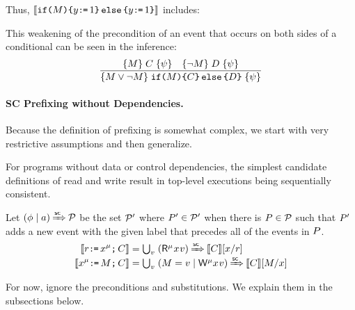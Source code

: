 Thus, $\llbracket\texttt{if}\allowbreak\texttt{(}M\texttt{)}\allowbreak\texttt{\{} y\texttt{:}\mkern-1mu\texttt{=}\,1 \texttt{\}}\,\allowbreak\texttt{else}\allowbreak\,\texttt{\{} y\texttt{:}\mkern-1mu\texttt{=}\,1\texttt{\}}\rrbracket$ includes:
\begin{tikzdisplay}[node distance=1em]
\end{tikzdisplay}
This weakening of the precondition of an event that occurs on both sides of a
conditional can be seen in the inference:
\begin{displaymath}
  \frac{
    \{M\}\allowbreak\;C\;\allowbreak\{\psi\}
    \quad
    \{\lnot M\}\allowbreak\;D\;\allowbreak\{\psi\}
  }{
    \{M\lor \lnot M\}\allowbreak\;\texttt{if}\allowbreak\texttt{(}M\texttt{)}\allowbreak\texttt{\{} C \texttt{\}}\,\allowbreak\texttt{else}\allowbreak\,\texttt{\{} D\texttt{\}}\;\allowbreak\{\psi\}
  }
\end{displaymath}


\paragraph{SC Prefixing without Dependencies.}
Because the definition of prefixing is somewhat complex, we start with very
restrictive assumptions and then generalize.

For programs without data or control dependencies, the
simplest candidate definitions of read and write
result in top-level executions being sequentially consistent.
\begin{candidate}
  \label{def:rw:sc1}
  Let $(\phi \mid a) \mathbin{\smash{\xRightarrow{\mathsf{sc}}}} \mathcal{P}$ be the set $\mathcal{P}'$ where
  $P'\in\mathcal{P}'$ when there is $P\in\mathcal{P}$ such that $P'$ adds a
  new event with the given label that precedes all of the events in $P$.
  \begin{align*}
    \sem{\aReg\GETS\aLoc^\amode\SEMI \aCmd} & =
    \textstyle\bigcup_\aVal\; (\DRmode\aLoc\aVal) \prefixsc \sem{\aCmd}[\aLoc/\aReg] 
    \\
    \sem{\aLoc^\amode\GETS\aExp\SEMI \aCmd} & =
    \textstyle\bigcup_\aVal\; (\aExp=\aVal \mid \DWmode\aLoc\aVal) \prefixsc \sem{\aCmd}[\aExp/\aLoc]
  \end{align*}
\end{candidate}
For now, ignore the preconditions and substitutions. We explain them in the subsections below.

